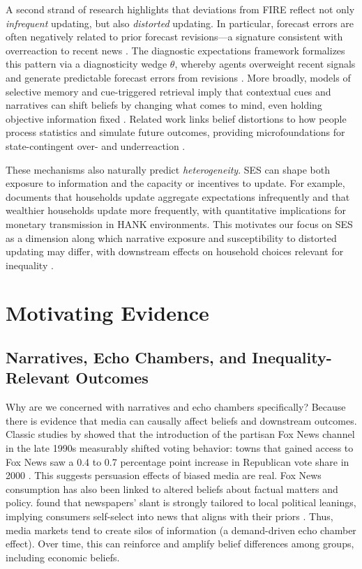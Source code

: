 \documentclass[12pt]{article}
\begin{document}
A second strand of research highlights that deviations from FIRE reflect not only \emph{infrequent} updating, but also \emph{distorted} updating. In particular, forecast errors are often negatively related to prior forecast revisions---a signature consistent with overreaction to recent news \citep{CoibionGorodnichenko2015}. The diagnostic expectations framework formalizes this pattern via a diagnosticity wedge $\theta$, whereby agents overweight recent signals and generate predictable forecast errors from revisions \citep{BordaloGennaioliMaShleifer2020}. More broadly, models of selective memory and cue-triggered retrieval imply that contextual cues and narratives can shift beliefs by changing what comes to mind, even holding objective information fixed \citep{BordaloGennaioliShleifer2020MemoryAttentionChoice}. Related work links belief distortions to how people process statistics and simulate future outcomes, providing microfoundations for state-contingent over- and underreaction \citep{BordaloConlonGennaioliKwonShleifer2026HowPeopleUseStatistics,BordaloBurroCoffmanGennaioliShleifer2025ImaginingFuture}.

These mechanisms also naturally predict \emph{heterogeneity}. SES can shape both exposure to information and the capacity or incentives to update. For example, \citet{difrancesco2024_sticky_information_wealth} documents that households update aggregate expectations infrequently and that wealthier households update more frequently, with quantitative implications for monetary transmission in HANK environments. This motivates our focus on SES as a dimension along which narrative exposure and susceptibility to distorted updating may differ, with downstream effects on household choices relevant for inequality \citep{GarnacheSchmalzSommervollStickyAssetPrices}.

\section{Motivating Evidence}

\subsection*{Narratives, Echo Chambers, and Inequality-Relevant Outcomes}
Why are we concerned with narratives and echo chambers specifically? Because there is evidence that media can causally affect beliefs and downstream outcomes. Classic studies by \citet{DellaVigna2007} showed that the introduction of the partisan Fox News channel in the late 1990s measurably shifted voting behavior: towns that gained access to Fox News saw a 0.4 to 0.7 percentage point increase in Republican vote share in 2000 \citep{DellaVigna2007}. This suggests persuasion effects of biased media are real. Fox News consumption has also been linked to altered beliefs about factual matters and policy. \citet{GentzkowShapiro2010} found that newspapers' slant is strongly tailored to local political leanings, implying consumers self-select into news that aligns with their priors \citep{DellaVigna2007}. Thus, media markets tend to create silos of information (a demand-driven echo chamber effect). Over time, this can reinforce and amplify belief differences among groups, including economic beliefs.
\end{document}
